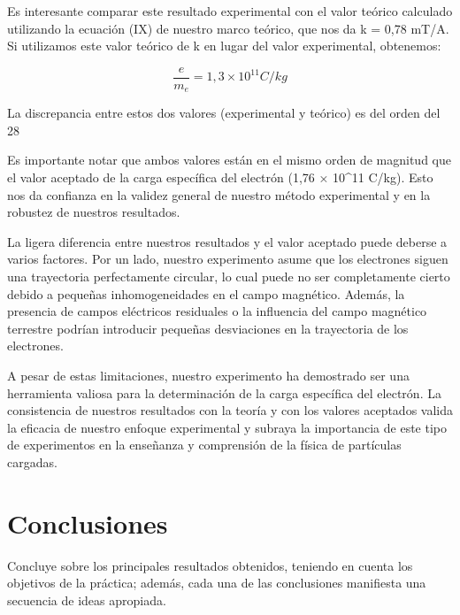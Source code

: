 \documentclass[twocolumn,a4paper,11pt]{scrartcl}
\begin{document}
Es interesante comparar este resultado experimental con el valor teórico calculado utilizando la ecuación (IX) de nuestro marco teórico, que nos da k = 0,78 mT/A. Si utilizamos este valor teórico de k en lugar del valor experimental, obtenemos:

\begin{equation}
\frac{e}{m_e} = 1,3 \times 10^{11} C/kg
\end{equation}

La discrepancia entre estos dos valores (experimental y teórico) es del orden del 28%

Es importante notar que ambos valores están en el mismo orden de magnitud que el valor aceptado de la carga específica del electrón (1,76 × 10^11 C/kg). Esto nos da confianza en la validez general de nuestro método experimental y en la robustez de nuestros resultados.

La ligera diferencia entre nuestros resultados y el valor aceptado puede deberse a varios factores. Por un lado, nuestro experimento asume que los electrones siguen una trayectoria perfectamente circular, lo cual puede no ser completamente cierto debido a pequeñas inhomogeneidades en el campo magnético. Además, la presencia de campos eléctricos residuales o la influencia del campo magnético terrestre podrían introducir pequeñas desviaciones en la trayectoria de los electrones.

A pesar de estas limitaciones, nuestro experimento ha demostrado ser una herramienta valiosa para la determinación de la carga específica del electrón. La consistencia de nuestros resultados con la teoría y con los valores aceptados valida la eficacia de nuestro enfoque experimental y subraya la importancia de este tipo de experimentos en la enseñanza y comprensión de la física de partículas cargadas.

\section{Conclusiones}
Concluye sobre los principales resultados obtenidos, teniendo en cuenta los objetivos de la práctica; además, cada una de las conclusiones manifiesta una secuencia de ideas apropiada.


  
\end{document}
